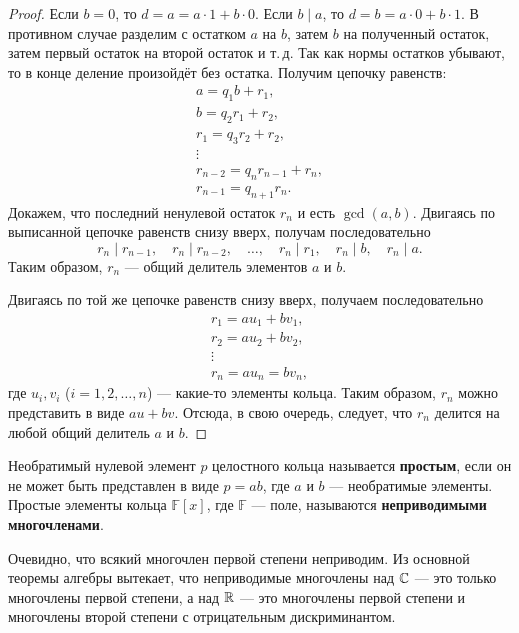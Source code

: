 \begin{proof}
    Если $b = 0$, то $d = a = a \cdot 1 + b \cdot 0$. Если $b \mid a$, то $d = b = a \cdot 0 + b \cdot 1$. В противном случае разделим с остатком $a$ на $b$, затем $b$ на полученный остаток, затем первый остаток на второй остаток и т.\,д. Так как нормы остатков убывают, то в конце деление произойдёт без остатка. Получим цепочку равенств:
    $$
    \begin{array}{l}
        a = q_1b + r_1,\\
        b = q_2r_1 + r_2,\\
        r_1 = q_3r_2 + r_2,\\
        \vdots\\
        r_{n - 2} = q_nr_{n - 1} + r_n,\\
        r_{n - 1} = q_{n + 1}r_n.
    \end{array}
    $$
    Докажем, что последний ненулевой остаток $r_n$ и есть $\gcd(a, b)$. Двигаясь по выписанной цепочке равенств снизу вверх, получам последовательно
    $$
    r_n \mid r_{n - 1},\quad r_n \mid r_{n - 2},\quad \ldots,\quad r_n \mid r_1,\quad r_n \mid b,\quad r_n \mid a.
    $$
    Таким образом, $r_n$ --- общий делитель элементов $a$ и $b$.

    Двигаясь по той же цепочке равенств снизу вверх, получаем последовательно
    $$
    \begin{array}{l}
        r_1 = au_1 + bv_1,\\
        r_2 = au_2 +bv_2,\\
        \vdots\\
        r_n = au_n = bv_n,
    \end{array}
    $$
    где $u_i, v_i$ ($i = 1, 2, \ldots, n$) --- какие-то элементы кольца. Таким образом, $r_n$ можно представить в виде $au + bv$. Отсюда, в свою очередь, следует, что $r_n$ делится на любой общий делитель $a$ и $b$.
\end{proof}

\begin{definition}
    Необратимый нулевой элемент $p$ целостного кольца называется \textbf{простым}, если он не может быть представлен в виде $p = ab$, где $a$ и $b$ --- необратимые элементы. Простые элементы кольца $\mathbb{F}[x]$, где $\mathbb{F}$ --- поле, называются \textbf{неприводимыми многочленами}.
\end{definition}

Очевидно, что всякий многочлен первой степени неприводим. Из основной теоремы алгебры вытекает, что неприводимые многочлены над $\mathbb{C}$ --- это только многочлены первой степени, а над $\mathbb{R}$ --- это многочлены первой степени и многочлены второй степени с отрицательным дискриминантом.

